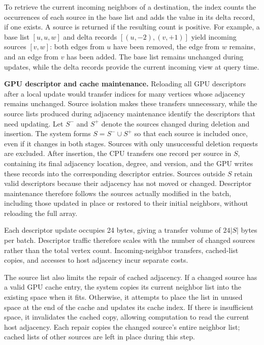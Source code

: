 To retrieve the current incoming neighbors of a destination, the index counts the occurrences of each source in the base list and adds the value in its delta record, if one exists. A source is returned if the resulting count is positive. For example, a base list $[u,u,w]$ and delta records $[(u,-2),(v,+1)]$ yield incoming sources $[v,w]$: both edges from $u$ have been removed, the edge from $w$ remains, and an edge from $v$ has been added. The base list remains unchanged during updates, while the delta records provide the current incoming view at query time.


\textbf{GPU descriptor and cache maintenance.} Reloading all GPU descriptors after a local update would transfer indices for many vertices whose adjacency remains unchanged. Source isolation makes these transfers unnecessary, while the source lists produced during adjacency maintenance identify the descriptors that need updating. Let $S^-$ and $S^+$ denote the sources changed during deletion and insertion. The system forms $S=S^-\cup S^+$ so that each source is included once, even if it changes in both stages. Sources with only unsuccessful deletion requests are excluded. After insertion, the CPU transfers one record per source in $S$, containing its final adjacency location, degree, and version, and the GPU writes these records into the corresponding descriptor entries. Sources outside $S$ retain valid descriptors because their adjacency has not moved or changed. Descriptor maintenance therefore follows the sources actually modified in the batch, including those updated in place or restored to their initial neighbors, without reloading the full array.

Each descriptor update occupies 24 bytes, giving a transfer volume of $24|S|$ bytes per batch. Descriptor traffic therefore scales with the number of changed sources rather than the total vertex count. Incoming-neighbor transfers, cached-list copies, and accesses to host adjacency incur separate costs.

The source list also limits the repair of cached adjacency. If a changed source has a valid GPU cache entry, the system copies its current neighbor list into the existing space when it fits. Otherwise, it attempts to place the list in unused space at the end of the cache and updates its cache index. If there is insufficient space, it invalidates the cached copy, allowing computation to read the current host adjacency. Each repair copies the changed source's entire neighbor list; cached lists of other sources are left in place during this step.

